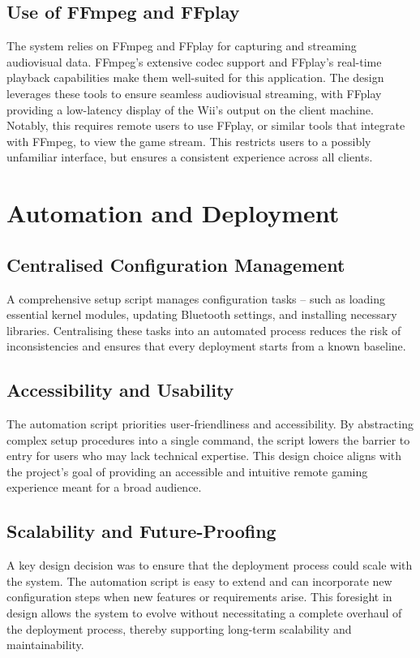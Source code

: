 \subsection{Use of FFmpeg and FFplay}
The system relies on FFmpeg\cite{wikipediaFFmpeg} and FFplay\cite{ffplay} for capturing and streaming audiovisual data. FFmpeg’s extensive codec support and FFplay’s real-time playback capabilities make them well-suited for this application. The design leverages these tools to ensure seamless audiovisual streaming, with FFplay providing a low-latency display of the Wii’s output on the client machine. Notably, this requires remote users to use FFplay, or similar tools that integrate with FFmpeg, to view the game stream. This restricts users to a possibly unfamiliar interface, but ensures a consistent experience across all clients.

\section{Automation and Deployment}

\subsection{Centralised Configuration Management}
A comprehensive setup script manages configuration tasks -- such as loading essential kernel modules, updating Bluetooth settings, and installing necessary libraries. Centralising these tasks into an automated process reduces the risk of inconsistencies and ensures that every deployment starts from a known baseline.

\subsection{Accessibility and Usability}
The automation script priorities user-friendliness and accessibility. By abstracting complex setup procedures into a single command, the script lowers the barrier to entry for users who may lack technical expertise. This design choice aligns with the project’s goal of providing an accessible and intuitive remote gaming experience meant for a broad audience.

\subsection{Scalability and Future-Proofing}
A key design decision was to ensure that the deployment process could scale with the system. The automation script is easy to extend and can incorporate new configuration steps when new features or requirements arise. This foresight in design allows the system to evolve without necessitating a complete overhaul of the deployment process, thereby supporting long-term scalability and maintainability.


